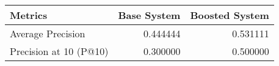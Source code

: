 \begin{tabular}{lrr}
\toprule
               Metrics &  Base System &  Boosted System \\
\midrule
     Average Precision &     0.444444 &        0.531111 \\
Precision at 10 (P@10) &     0.300000 &        0.500000 \\
\bottomrule
\end{tabular}
